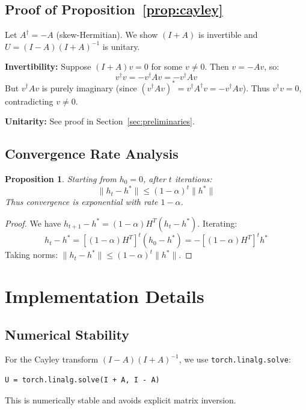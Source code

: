 \documentclass[11pt,a4paper]{article}
\newtheorem{proposition}[theorem]{Proposition}
\begin{document}
\subsection{Proof of Proposition~\ref{prop:cayley}}

Let $A^\dagger = -A$ (skew-Hermitian). We show $(I+A)$ is invertible and $U = (I-A)(I+A)^{-1}$ is unitary.

\textbf{Invertibility:} Suppose $(I+A)v = 0$ for some $v \neq 0$. Then $v = -Av$, so:
\begin{equation}
v^\dagger v = -v^\dagger A v = -v^\dagger A v
\end{equation}
But $v^\dagger A v$ is purely imaginary (since $(v^\dagger A v)^* = v^\dagger A^\dagger v = -v^\dagger A v$). Thus $v^\dagger v = 0$, contradicting $v \neq 0$.

\textbf{Unitarity:} See proof in Section~\ref{sec:preliminaries}.

\subsection{Convergence Rate Analysis}

\begin{proposition}
Starting from $h_0 = 0$, after $t$ iterations:
\begin{equation}
\|h_t - h^*\| \leq (1-\alpha)^t \|h^*\|
\end{equation}
Thus convergence is exponential with rate $1-\alpha$.
\end{proposition}

\begin{proof}
We have $h_{t+1} - h^* = (1-\alpha)H^T(h_t - h^*)$. Iterating:
\begin{equation}
h_t - h^* = [(1-\alpha)H^T]^t (h_0 - h^*) = -[(1-\alpha)H^T]^t h^*
\end{equation}
Taking norms: $\|h_t - h^*\| \leq (1-\alpha)^t \|h^*\|$.
\end{proof}

\section{Implementation Details}
\label{app:implementation}

\subsection{Numerical Stability}

For the Cayley transform $(I-A)(I+A)^{-1}$, we use \texttt{torch.linalg.solve}:
\begin{verbatim}
U = torch.linalg.solve(I + A, I - A)
\end{verbatim}
This is numerically stable and avoids explicit matrix inversion.
\end{document}
